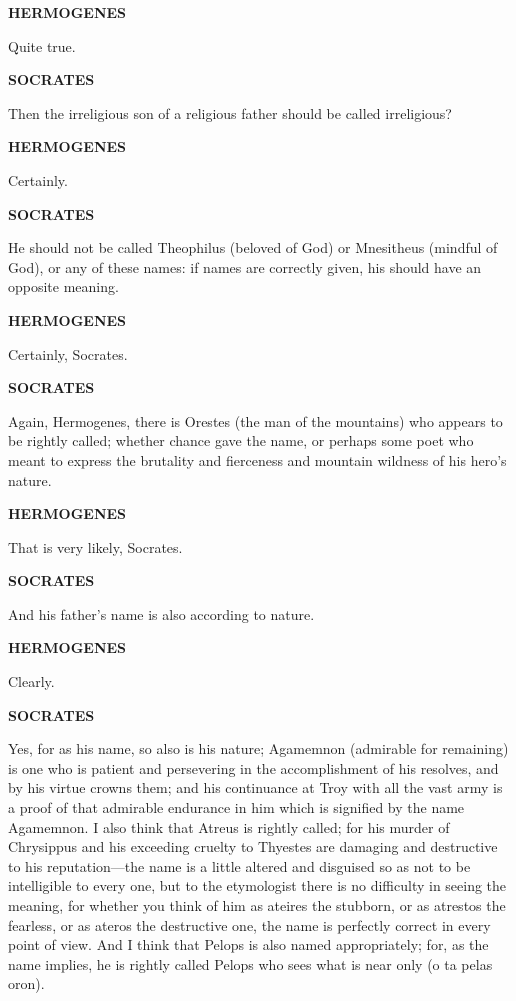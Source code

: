 \documentclass[11pt,letter]{article}
\begin{document}
\par \textbf{HERMOGENES}
\par   Quite true.

\par \textbf{SOCRATES}
\par   Then the irreligious son of a religious father should be called irreligious?

\par \textbf{HERMOGENES}
\par   Certainly.

\par \textbf{SOCRATES}
\par   He should not be called Theophilus (beloved of God) or Mnesitheus (mindful of God), or any of these names:  if names are correctly given, his should have an opposite meaning.

\par \textbf{HERMOGENES}
\par   Certainly, Socrates.

\par \textbf{SOCRATES}
\par   Again, Hermogenes, there is Orestes (the man of the mountains) who appears to be rightly called; whether chance gave the name, or perhaps some poet who meant to express the brutality and fierceness and mountain wildness of his hero’s nature.

\par \textbf{HERMOGENES}
\par   That is very likely, Socrates.

\par \textbf{SOCRATES}
\par   And his father’s name is also according to nature.

\par \textbf{HERMOGENES}
\par   Clearly.

\par \textbf{SOCRATES}
\par   Yes, for as his name, so also is his nature; Agamemnon (admirable for remaining) is one who is patient and persevering in the accomplishment of his resolves, and by his virtue crowns them; and his continuance at Troy with all the vast army is a proof of that admirable endurance in him which is signified by the name Agamemnon. I also think that Atreus is rightly called; for his murder of Chrysippus and his exceeding cruelty to Thyestes are damaging and destructive to his reputation—the name is a little altered and disguised so as not to be intelligible to every one, but to the etymologist there is no difficulty in seeing the meaning, for whether you think of him as ateires the stubborn, or as atrestos the fearless, or as ateros the destructive one, the name is perfectly correct in every point of view. And I think that Pelops is also named appropriately; for, as the name implies, he is rightly called Pelops who sees what is near only (o ta pelas oron).
\end{document}
